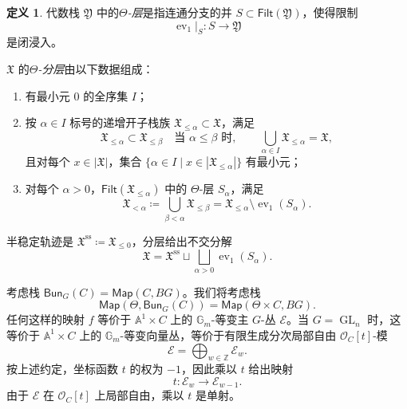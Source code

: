 \documentclass{amsart}
\theoremstyle{definition}
\newtheorem{defn}[thm]{定义}
\theoremstyle{remark}
\theoremstyle{plain}
\theoremstyle{definition}
\theoremstyle{remark}
\newcommand{\A}{\mathbb{A}}
\newcommand{\G}{\mathbb{G}}
\newcommand{\Z}{\mathbb{Z}}
\newcommand{\mc}[1]{\mathcal{#1}}
\newcommand{\mf}[1]{\mathfrak{#1}}
\newcommand{\mr}[1]{\mathrm{#1}}
\newcommand{\on}[1]{\operatorname{#1}}
\newcommand{\ms}[1]{\mathsf{#1}}
\newcommand{\1}{\mathbf{1}}
\newcommand{\2}{\mathbf{2}}
\newcommand{\3}{\mathbf{3}}
\DeclareMathOperator{\ev}{ev}
\begin{document}
\begin{defn}
    代数栈 \(\mf{Y}\) 中的\textit{\(\Theta\)-层}是指连通分支的并 \(S\subset\ms{Filt}(\mf{Y})\)，使得限制
    \[
        \ev_1|_S\colon S\longrightarrow\mf{Y}
    \]
    是闭浸入。

    \(\mf{X}\) 的\textit{\(\Theta\)-分层}由以下数据组成：
    \begin{enumerate}
        \item 有最小元 \(0\) 的全序集 \(I\)；
        \item 按 \(\alpha\in I\) 标号的递增开子栈族 \(\mf{X}_{\leq\alpha}\subset\mf{X}\)，满足
        \[
            \mf{X}_{\leq\alpha}\subset\mf{X}_{\leq\beta}
            \quad\text{当 }\alpha\leq\beta\text{ 时},
            \qquad
            \bigcup_{\alpha\in I}\mf{X}_{\leq\alpha}=\mf{X},
        \]
        且对每个 \(x\in|\mf{X}|\)，集合 \(\{\alpha\in I\mid x\in|\mf{X}_{\leq\alpha}|\}\) 有最小元；
        \item 对每个 \(\alpha>0\)，\(\ms{Filt}(\mf{X}_{\leq\alpha})\) 中的 \(\Theta\)-层 \(S_\alpha\)，满足
        \[
            \mf{X}_{<\alpha}
            \coloneqq
            \bigcup_{\beta<\alpha}\mf{X}_{\leq\beta}
            =
            \mf{X}_{\leq\alpha}\setminus\ev_1(S_\alpha).
        \]
    \end{enumerate}
    半稳定轨迹是 \(\mf{X}^{\mr{ss}}\coloneqq\mf{X}_{\leq0}\)，分层给出不交分解
    \[
        \mf{X}
        =
        \mf{X}^{\mr{ss}}
        \sqcup
        \bigsqcup_{\alpha>0}\ev_1(S_\alpha).
    \]
\end{defn}

考虑栈 \(\ms{Bun}_G(C) = \ms{Map}(C, BG)\)。我们将考虑栈
\[ \ms{Map}(\Theta, \ms{Bun}_G(C)) = \ms{Map}(\Theta \times C, BG). \]
任何这样的映射 \(f\) 等价于 \(\A^1\times C\) 上的 \(\G_m\)-等变主 \(G\)-丛 \(\mc{E}\)。当 \(G=\on{GL}_n\) 时，这等价于 \(\A^1\times C\) 上的 \(\G_m\)-等变向量丛，等价于有限生成分次局部自由 \(\mc{O}_C[t]\)-模
\[
    \mc{E}=\bigoplus_{w\in\Z}\mc{E}_w.
\]
按上述约定，坐标函数 \(t\) 的权为 \(-1\)，因此乘以 \(t\) 给出映射
\[
    t\colon\mc{E}_w\longrightarrow\mc{E}_{w-1}.
\]
由于 \(\mc{E}\) 在 \(\mc{O}_C[t]\) 上局部自由，乘以 \(t\) 是单射。
\end{document}
